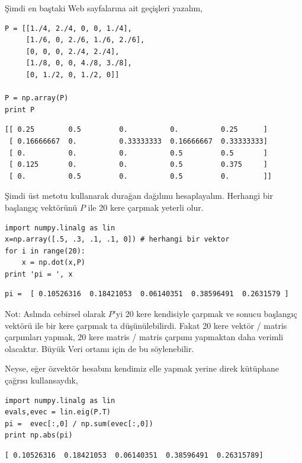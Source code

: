 \documentclass[12pt,fleqn]{article}\usepackage{../../common}
\begin{document}
Şimdi en baştaki Web sayfalarına ait geçişleri yazalım,

\begin{verbatim}
P = [[1./4, 2./4, 0, 0, 1./4],
     [1./6, 0, 2./6, 1./6, 2./6],
     [0, 0, 0, 2./4, 2./4],
     [1./8, 0, 0, 4./8, 3./8],
     [0, 1./2, 0, 1./2, 0]]

P = np.array(P)
print P
\end{verbatim}

\begin{verbatim}
[[ 0.25        0.5         0.          0.          0.25      ]
 [ 0.16666667  0.          0.33333333  0.16666667  0.33333333]
 [ 0.          0.          0.          0.5         0.5       ]
 [ 0.125       0.          0.          0.5         0.375     ]
 [ 0.          0.5         0.          0.5         0.        ]]
\end{verbatim}

Şimdi üst metotu kullanarak durağan dağılımı hesaplayalım. Herhangi bir
başlangıç vektörünü $P$ ile 20 kere  çarpmak yeterli olur.

\begin{verbatim}
import numpy.linalg as lin
x=np.array([.5, .3, .1, .1, 0]) # herhangi bir vektor
for i in range(20): 
    x = np.dot(x,P)
print 'pi = ', x
\end{verbatim}

\begin{verbatim}
pi =  [ 0.10526316  0.18421053  0.06140351  0.38596491  0.2631579 ]
\end{verbatim}

Not: Aslında cebirsel olarak $P$'yi 20 kere kendisiyle çarpmak ve sonucu
başlangıç vektörü ile bir kere çarpmak ta düşünülebilirdi. Fakat 20 kere
vektör / matris çarpımları yapmak, 20 kere matris / matris çarpımı
yapmaktan daha verimli olacaktır. Büyük Veri ortamı için de bu söylenebilir.

Neyse, eğer özvektör hesabını kendimiz elle yapmak yerine direk kütüphane
çağrısı kullansaydık,

\begin{verbatim}
import numpy.linalg as lin
evals,evec = lin.eig(P.T)
pi =  evec[:,0] / np.sum(evec[:,0])
print np.abs(pi)
\end{verbatim}

\begin{verbatim}
[ 0.10526316  0.18421053  0.06140351  0.38596491  0.26315789]
\end{verbatim}
\end{document}
